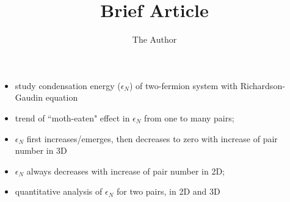 \documentclass[11pt]{article}
\title{Brief Article}
\author{The Author}
\begin{document}
\begin{itemize}
\item study condensation energy ($\epsilon_{N}$) of two-fermion system with Richardson-Gaudin equation
\item trend of ``moth-eaten" effect in $\epsilon_{N}$ from one to many pairs;
\item $\epsilon_{N}$ first increases/emerges, then decreases to zero with increase of pair number in 3D
\item $\epsilon_{N}$ always decreases with increase of pair number in 2D;
\item quantitative analysis of $\epsilon_{N}$ for two pairs, in 2D and 3D 
\end{itemize}
\end{document}
